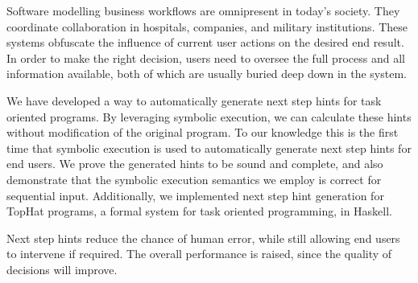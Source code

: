 
Software modelling business workflows are omnipresent in today's society.
They coordinate collaboration in hospitals, companies, and military institutions.
These systems obfuscate the influence of current user actions on the desired end result.
In order to make the right decision, users need to oversee the full process and all information available,
both of which are usually buried deep down in the system.

We have developed a way to automatically generate next step hints for task oriented programs.
By leveraging symbolic execution, we can calculate these hints without modification of the original program.
To our knowledge this is the first time that symbolic execution is used to automatically generate next step hints for end users.
We prove the generated hints to be sound and complete,
and also demonstrate that the symbolic execution semantics we employ is correct for sequential input.
Additionally, we implemented next step hint generation for TopHat programs, a formal system for task oriented programming, in Haskell.

Next step hints reduce the chance of human error, while still allowing end users to intervene if required.
The overall performance is raised, since the quality of decisions will improve.


